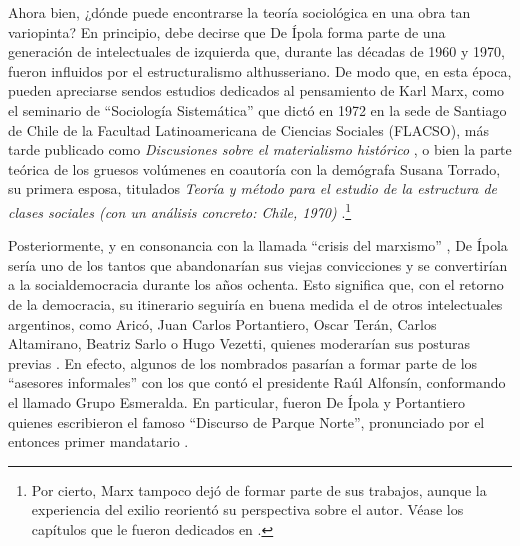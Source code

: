 {Ahora bien, ¿dónde puede encontrarse la teoría sociológica en una obra tan variopinta? En principio, debe decirse que De Ípola forma parte de una generación de intelectuales de izquierda que, durante las décadas de 1960 y 1970, fueron influidos por el estructuralismo althusseriano. De modo que, en esta época, pueden apreciarse sendos estudios dedicados al pensamiento de Karl Marx, como el seminario de \enquote{Sociología Sistemática} que dictó en 1972 en la sede de Santiago de Chile de la Facultad Latinoamericana de Ciencias Sociales (FLACSO), más tarde publicado como \emph{Discusiones sobre el materialismo histórico} \parencite{1599-DEIPOLA1974}, o bien la parte teórica de los gruesos volúmenes en coautoría con la demógrafa Susana Torrado, su primera esposa, titulados \emph{Teoría y método para el estudio de la estructura de clases sociales (con un análisis concreto: Chile, 1970)} \parencite{1505-TORRADO1976}.\footnote{Por cierto, Marx tampoco dejó de formar parte de sus trabajos, aunque la experiencia del exilio reorientó su perspectiva sobre el autor. Véase los capítulos que le fueron dedicados en \textcite{1592-DEIPOLA1997,1600-DEIPOLA2001}.}

Posteriormente, y en consonancia con la llamada \enquote{crisis del marxismo} \parencite{279-ANDERSON2011}, De Ípola sería uno de los tantos que abandonarían sus viejas convicciones y se convertirían a la socialdemocracia durante los años ochenta. Esto significa que, con el retorno de la democracia, su itinerario seguiría en buena medida el de otros intelectuales argentinos, como Aricó, Juan Carlos Portantiero, Oscar Terán, Carlos Altamirano, Beatriz Sarlo o Hugo Vezetti, quienes moderarían sus posturas previas \parencite{1446-BURGOS2004}. En efecto, algunos de los nombrados pasarían a formar parte de los \enquote{asesores informales} con los que contó el presidente Raúl Alfonsín, conformando el llamado Grupo Esmeralda. En particular, fueron De Ípola y Portantiero quienes escribieron el famoso \enquote{Discurso de Parque Norte}, pronunciado por el entonces primer mandatario \parencite{1525-RINESI2004,1601-DEIPOLA1994,1602-DEIPOLA2004}.

}
